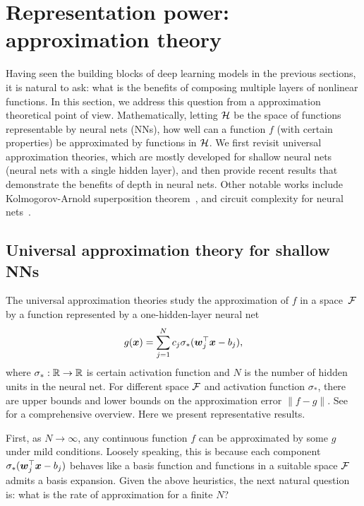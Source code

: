 \section{Representation power: approximation theory}\label{sec:approx}
Having seen the building blocks of deep learning models in the previous sections, it is natural to ask: what is the benefits of composing multiple layers of nonlinear functions. In this section, we address this question from a approximation theoretical point of view. Mathematically, letting $\mathcal{H}$ be the space of functions representable by neural nets (NNs),  how well can a function $f$ (with certain properties) be approximated by functions in $\mathcal{H}$. We first revisit universal approximation theories, which are mostly developed for shallow neural nets (neural nets with a single hidden layer), and then provide recent results that demonstrate the benefits of depth in neural nets. Other notable works include Kolmogorov-Arnold superposition theorem~\citep{arnold2009functions, sprecher1965structure}, and circuit complexity for neural nets~\citep{parberry1994circuit}.



\subsection{Universal approximation theory for shallow NNs}
The universal approximation theories study the approximation of $f$ in a space~$\mathcal{F}$ by a function represented by a one-hidden-layer neural net
\begin{equation}\label{def:HN}
g(\text{\boldmath $x$}) = \sum_{j=1}^N c_j \sigma_*(\text{\boldmath $w$}_j ^\top \text{\boldmath $x$} - b_j),
\end{equation}
where $\sigma_*: \mathbb{R} \to \mathbb{R}$ is certain activation function and $N$ is the number of hidden units in the neural net. For different space $\mathcal{F}$ and activation function $\sigma_*$, there are upper bounds and lower bounds on the approximation error $\| f - g \|$. See~\cite{pinkus1999approximation} for a comprehensive overview. Here we present representative results.

First, as $N \to \infty$, any continuous function $f$ can be approximated by some $g$ under mild conditions. Loosely speaking, this is because each component $\sigma_*(\text{\boldmath $w$}_j ^\top \text{\boldmath $x$} - b_j)$ behaves like a basis function %
and functions in a suitable space $\mathcal{F}$ admits a basis expansion. Given the above heuristics, the next natural question is: what is the rate of approximation for a finite $N$?

